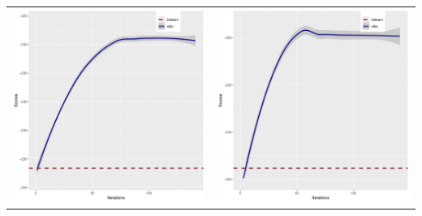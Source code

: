 \documentclass[]{scrartcl}
\begin{document}
\begin{tabular}{cc}
\includegraphics[scale = 0.4]{./figs/asia/mapEvolution-3-142.pdf} &
\includegraphics[scale = 0.4]{./figs/asia/mapEvolution-4-142.pdf} \\
\end{tabular}
\end{document}
